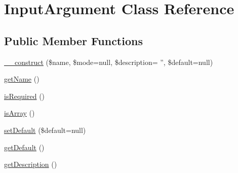 \hypertarget{class_symfony_1_1_components_1_1_console_1_1_input_1_1_input_argument}{
\section{InputArgument Class Reference}
\label{class_symfony_1_1_components_1_1_console_1_1_input_1_1_input_argument}
}
\subsection*{Public Member Functions}
\begin{DoxyCompactItemize}
\item 
\hyperlink{class_symfony_1_1_components_1_1_console_1_1_input_1_1_input_argument_a548c588c4d6abd4ec19367160d9f15f7}{\_\-\_\-construct} (\$name, \$mode=null, \$description= '', \$default=null)
\item 
\hyperlink{class_symfony_1_1_components_1_1_console_1_1_input_1_1_input_argument_a3d0963e68bb313b163a73f2803c64600}{getName} ()
\item 
\hyperlink{class_symfony_1_1_components_1_1_console_1_1_input_1_1_input_argument_ac26faa299b04174755ce0cca5f774585}{isRequired} ()
\item 
\hyperlink{class_symfony_1_1_components_1_1_console_1_1_input_1_1_input_argument_a2f0ab131ec6fa3f6f91721eb72ca10f0}{isArray} ()
\item 
\hyperlink{class_symfony_1_1_components_1_1_console_1_1_input_1_1_input_argument_aae7b38e461eb4bb55b0fc924ca924201}{setDefault} (\$default=null)
\item 
\hyperlink{class_symfony_1_1_components_1_1_console_1_1_input_1_1_input_argument_adc30a2a4d3e48cb6aee21562afbc4022}{getDefault} ()
\item 
\hyperlink{class_symfony_1_1_components_1_1_console_1_1_input_1_1_input_argument_a2e7bb35c71bf1824456ceb944cb7a845}{getDescription} ()
\end{DoxyCompactItemize}
